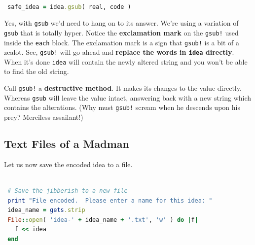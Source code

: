 \documentclass[10pt,twoside]{report}
\begin{document}
\begin{lstlisting}[basicstyle=\ttfamily\color{basiccolor},
    commentstyle = \ttfamily\color{commentcolor},
    keywordstyle=\ttfamily\color{keywordscolor},
    stringstyle=\color{stringcolor},
    language=Ruby,
    basicstyle=\small\ttfamily,
    showstringspaces=false,
  ]

 safe_idea = idea.gsub( real, code )

\end{lstlisting}


Yes, with \lstinline[breaklines=true]|gsub| we'd need to hang on to
its answer.  We're using a variation of
\lstinline[breaklines=true]|gsub| that is totally hyper.  Notice the
{\bf exclamation mark} on the \lstinline[breaklines=true]|gsub!| used
inside the \lstinline[breaklines=true]|each| block.  The exclamation
mark is a sign that \lstinline[breaklines=true]|gsub!| is a bit of a
zealot.  See, \lstinline[breaklines=true]|gsub!| will go ahead and
{\bf replace the words in \lstinline[breaklines=true]|idea| directly}.
When it's done \lstinline[breaklines=true]|idea| will contain the
newly altered string and you won't be able to find the old string.

Call \lstinline[breaklines=true]|gsub!| a {\bf destructive method}.
It makes its changes to the value directly.  Whereas
\lstinline[breaklines=true]|gsub| will leave the value intact,
answering back with a new string which contains the alterations. (Why
must \lstinline[breaklines=true]|gsub!| scream when he descends upon
his prey?  Merciless assailant!)

\newpage



\subsection{Text Files of a Madman}



Let us now save the encoded idea to a file.


\begin{lstlisting}[basicstyle=\ttfamily\color{basiccolor},
    commentstyle = \ttfamily\color{commentcolor},
    keywordstyle=\ttfamily\color{keywordscolor},
    stringstyle=\color{stringcolor},
    language=Ruby,
    basicstyle=\small\ttfamily,
    showstringspaces=false,
  ]

 # Save the jibberish to a new file
 print "File encoded.  Please enter a name for this idea: "
 idea_name = gets.strip
 File::open( 'idea-' + idea_name + '.txt', 'w' ) do |f|
   f << idea
 end

\end{lstlisting}
\end{document}
